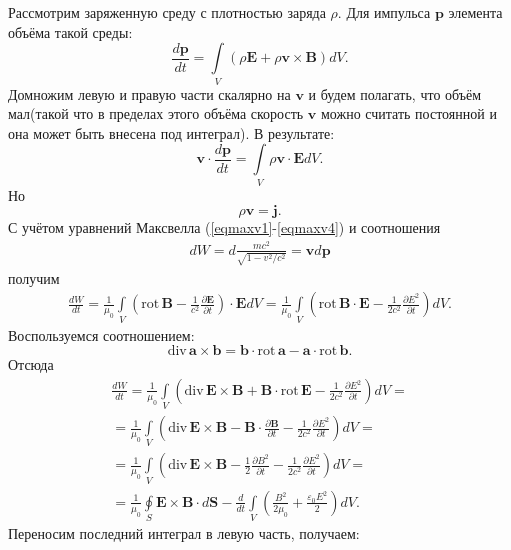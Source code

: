 \documentclass[a4paper,14pt]{extreport} %
\newcommand{\dff}[2]{\frac{\partial #1}{\partial #2}}
\newcommand{\Df}[1]{\frac{d}{d #1}}
\newcommand{\Dff}[2]{\frac{d #1}{d #2}}
\renewcommand{\vec}[1]{\bm{#1}}
\renewcommand{\div}{\mathrm{div}\,}
\newcommand{\rot}{\mathrm{rot}\,}
\newcommand{\eps}{\varepsilon}
\begin{document}
	Рассмотрим заряженную среду с плотностью заряда $\rho$. Для импульса $\vec{p}$ элемента объёма такой среды:
	\begin{equation*}
		\Dff{\vec{p}}{t} = \int\limits_{V} (\rho \vec{E} + \rho \vec{v}\times\vec{B} ) dV.
	\end{equation*}
	Домножим левую и правую части скалярно на $\vec{v}$ и будем полагать, что объём мал(такой что в пределах этого объёма скорость $\vec{v}$ можно считать постоянной и она может быть внесена под интеграл). В результате:
	\begin{equation*}
		\vec{v}\cdot\Dff{\vec{p}}{t} = \int\limits_{V} \rho \vec{v}\cdot\vec{E} dV.
	\end{equation*}
	Но
	\begin{equation*}
		\rho \vec{v} = \vec{j}.
	\end{equation*}
	С учётом уравнений Максвелла (\ref{eqmaxv1}-\ref{eqmaxv4}) и соотношения
	\begin{gather*}
		dW = d \frac{mc^2}{\sqrt{1 - v^2/c^2}} = \vec{v} d \vec{p}
	\end{gather*}
	получим 
	\begin{gather*}
		\Dff{W}{t} = 
		\frac{1}{\mu_0} \int\limits_{V} \left( \rot \vec{B} - \frac{1}{c^2} \dff{\vec{E}}{t} \right) \cdot \vec{E}dV =
		\frac{1}{\mu_0} \int\limits_{V} \left( \rot \vec{B} \cdot \vec{E} - \frac{1}{2 c^2} \dff{E^2}{t} \right) dV.
	\end{gather*}
	Воспользуемся соотношением:
	\begin{equation*}
		\div \vec{a}\times\vec{b} = \vec{b}\cdot \rot \vec{a} - \vec{a}\cdot \rot \vec{b}.
	\end{equation*}
	Отсюда
	\begin{gather*}
		\Dff{W}{t} = 
		\frac{1}{\mu_0} \int\limits_{V} \left( \div \vec{E}\times\vec{B} + \vec{B}\cdot \rot \vec{E} - \frac{1}{2 c^2} \dff{E^2}{t} \right) dV = \\
		= 
		\frac{1}{\mu_0} \int\limits_{V} \left( \div \vec{E}\times\vec{B} - \vec{B}\cdot\dff{\vec{B}}{t}  - \frac{1}{2 c^2} \dff{E^2}{t} \right) dV = \\ 
		=
		\frac{1}{\mu_0} \int\limits_{V} \left( \div \vec{E}\times\vec{B} - \frac{1}{2}\dff{B^2}{t}  - \frac{1}{2 c^2} \dff{E^2}{t} \right) dV = \\
		=
		\frac{1}{\mu_0} \oint\limits_{S} \vec{E}\times\vec{B}\cdot d\vec{S} -
		\Df{t} \int\limits_{V} \left( \frac{B^2}{2\mu_0} + \frac{\eps_0 E^2}{2}\right) dV.
	\end{gather*}
	Переносим последний интеграл в левую часть, получаем:
\end{document}
